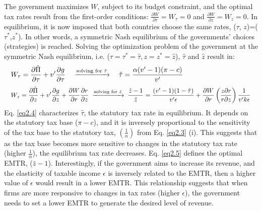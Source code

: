 The government maximizes $W$, subject to its budget constraint, and the optimal tax rates result from the first-order conditions: $\frac{\partial W}{\partial \tau}=W_\tau=0$ and $\frac{\partial W}{\partial z}=W_z=0$. In equilibrium, it is now imposed that both countries choose the same rates, ($\tau$, $z$)=($\tau^*$,$z^*$). In other words, a symmetric Nash equilibrium of the governments' choices (strategies) is reached. Solving the optimization problem of the government at the symmetric Nash equilibrium, i.e. ($\tau=\tau^*=\hat{\tau}, z=z^*=\hat{z}$), $\hat{\tau}$ and $\hat{z}$ result in:
\begin{align}
    \label{eq2.4}&W_\tau=\frac{\partial \hat{\Pi}}{\partial \tau}+v'\frac{\partial g}{\partial \tau}\quad \xrightarrow{\text{solving for }\hat{\tau}} \quad \hat{\tau}=\frac{\alpha(v'-1)(\pi-c)}{v'}\\[3pt]
\label{eq2.5}
&\scalemath{0.91}{W_z=\frac{\partial \hat{\Pi}}{\partial z}+v'\frac{\partial g}{\partial z}+\frac{\partial W}{\partial r}\frac{\partial r}{\partial z}\; \xrightarrow{\text{solving for }\hat{z}} \; \frac{\hat{z}-1}{\hat{z}}=\frac{(v'-1)(1-\hat{\tau})}{v'\epsilon}+\frac{\partial W}{\partial r}\left( \frac{z\partial r}{r\partial z}\right) \frac{1}{v'k\epsilon}}
\end{align}
Eq. \ref{eq2.4} characterizes $\hat{\tau}$, the statutory tax rate in equilibrium. It depends on the statutory tax base ($\pi-c$), and it is inversely proportional to the sensitivity of the tax base to the statutory tax, $\left(\frac{1}{\alpha}\right)$ from Eq. \ref{eq2.3} (i). This suggests that as the tax base becomes more sensitive to changes in the statutory tax rate (higher $\frac{1}{\alpha}$), the equilibrium tax rate decreases. Eq. \ref{eq2.5} defines the optimal EMTR, ($\hat{z}-1$). Interestingly, if the government aims to increase its revenue, and the elasticity of taxable income $\epsilon$ is inversely related to the EMTR, then a higher value of $\epsilon$ would result in a lower EMTR. This relationship suggests that when firms are more responsive to changes in tax rates (higher $\epsilon$), the government needs to set a lower EMTR to generate the desired level of revenue.
\vspace{-7pt}
